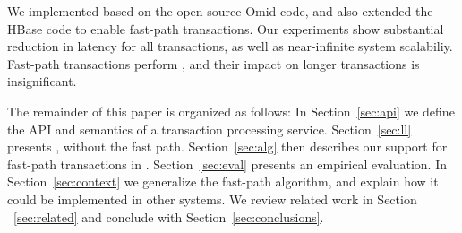 We implemented {\sys\/} based on the open source Omid code, and also extended the HBase code to 
enable fast-path transactions. Our experiments show substantial reduction in latency for all transactions, 
as well as near-infinite system scalabiliy. Fast-path transactions perform , and their impact on longer transactions is insignificant. 

The remainder of this paper is organized as follows:
In Section~\ref{sec:api} we define the  API and semantics of a transaction processing service. 
Section~\ref{sec:ll} presents \sys, without the fast path. 
Section~\ref{sec:alg} then describes our support for fast-path  transactions in \sys.  
Section~\ref{sec:eval} presents an empirical evaluation.
In Section~\ref{sec:context} we generalize the fast-path algorithm, and explain how it could be implemented in 
other systems. We review related work in Section ~\ref{sec:related} and conclude with Section~\ref{sec:conclusions}.
